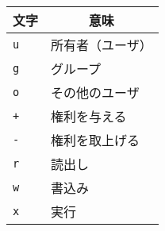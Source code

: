 \documentclass{standalone}
\begin{document}
{\ttfamily
\begin{tabular}{l | l}
\hline\hline
\multicolumn{1}{c|}{文字} & \multicolumn{1}{c}{意味}\\\hline
\texttt{u}  & 所有者（ユーザ） \\
\texttt{g}  & グループ         \\
\texttt{o}  & その他のユーザ   \\
\texttt{+}  & 権利を与える     \\
\texttt{-}  & 権利を取上げる   \\
\texttt{r}  & 読出し           \\
\texttt{w}  & 書込み           \\
\texttt{x}  & 実行             \\
\end{tabular}}
\end{document}
